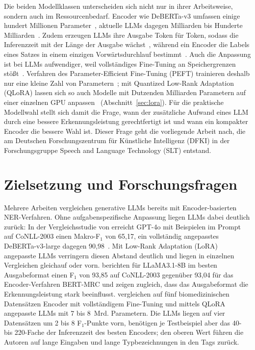 Die beiden Modellklassen unterscheiden sich nicht nur in ihrer
Arbeitsweise, sondern auch im Ressourcenbedarf.
Encoder wie DeBERTa-v3 umfassen einige hundert Millionen
Parameter~\cite{he2021debertav3,he2021debertav3card,he2021debertav3cardlarge}, aktuelle LLMs dagegen Milliarden bis
Hunderte Milliarden~\cite{zhao2023survey,qwen2026card397b}.
Zudem erzeugen LLMs ihre Ausgabe Token für Token, sodass die Inferenzzeit
mit der Länge der Ausgabe wächst~\cite{lu2024padellm}, während ein Encoder
die Labels eines Satzes in einem einzigen Vorwärtsdurchlauf
bestimmt~\cite{devlin2019bert,obeidat2025llm}.
Auch die Anpassung ist bei LLMs aufwendiger, weil vollständiges
Fine-Tuning an Speichergrenzen stößt~\cite{hu2021lora}.
Verfahren des Parameter-Efficient Fine-Tuning (PEFT) trainieren deshalb
nur eine kleine Zahl von Parametern~\cite{han2024parameter};
mit Quantized Low-Rank Adaptation (QLoRA) lassen sich so auch Modelle mit Dutzenden Milliarden Parametern
auf einer einzelnen GPU anpassen~\cite{dettmers2023qlora}
(Abschnitt~\ref{sec:lora}).
Für die praktische Modellwahl stellt sich damit die Frage, wann der
zusätzliche Aufwand eines LLM durch eine bessere Erkennungsleistung
gerechtfertigt ist und wann ein kompakter Encoder die bessere Wahl ist.
Dieser Frage geht die vorliegende Arbeit nach, die am Deutschen
Forschungszentrum für Künstliche Intelligenz (DFKI) in der
Forschungsgruppe Speech and Language Technology (SLT) entstand.

\section{Zielsetzung und Forschungsfragen}
\label{sec:problem_ziel}

Mehrere Arbeiten vergleichen generative LLMs bereits mit Encoder-basierten
NER-Verfahren.
Ohne aufgabenspezifische Anpassung liegen LLMs dabei deutlich zurück:
In der Vergleichsstudie von \textcite{keraghel2024recent} erreicht GPT-4o
mit Beispielen im Prompt auf CoNLL-2003 einen Makro-F$_1$ von
65{,}17, ein vollständig angepasstes DeBERTa-v3-large dagegen
90{,}98~\cite[Tab.~5]{keraghel2024recent}.
Mit Low-Rank Adaptation (LoRA) angepasste LLMs verringern diesen Abstand deutlich und liegen in
einzelnen Vergleichen gleichauf oder vorn.
\textcite{zhan2026generativeNER} berichten für LLaMA3.1-8B im besten
Ausgabeformat einen F$_1$ von 93{,}85 auf CoNLL-2003 gegenüber 93{,}04 für
das Encoder-Verfahren BERT-MRC und zeigen zugleich, dass das Ausgabeformat
die Erkennungsleistung stark beeinflusst.
\textcite{obeidat2025llm} vergleichen auf fünf biomedizinischen
Datensätzen Encoder mit vollständigem Fine-Tuning und mittels QLoRA
angepasste LLMs mit 7 bis 8~Mrd. Parametern.
Die LLMs liegen auf vier Datensätzen um 2 bis 8 F$_1$-Punkte vorn,
benötigen je Testbeispiel aber das 40- bis 220-Fache der Inferenzzeit des
besten Encoders; den oberen Wert führen die Autoren auf lange Eingaben
und lange Typbezeichnungen in den Tags zurück.

